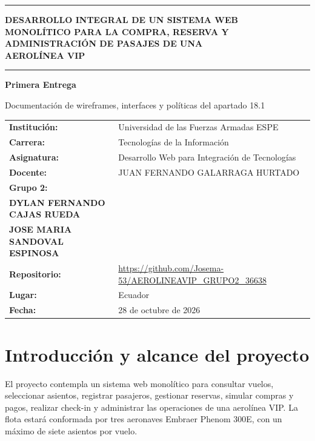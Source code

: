 \documentclass[11pt,a4paper]{article}
\newcommand{\Institucion}{Universidad de las Fuerzas Armadas ESPE}
\newcommand{\Carrera}{Tecnologías de la Información}
\newcommand{\Asignatura}{Desarrollo Web para Integración de Tecnologías}
\newcommand{\Docente}{JUAN FERNANDO GALARRAGA HURTADO}
\newcommand{\NumGrupo}{2}
\newcommand{\FechaEntrega}{28 de octubre de 2026}
\newcommand{\Integrantes}{%
DIEGO ALEJANDRO ALCACIEGA TIGSE\\[4pt]
DYLAN FERNANDO CAJAS RUEDA\\[4pt]
JOSE MARIA SANDOVAL ESPINOSA}
\newcommand{\Repositorio}{\url{https://github.com/Josema-53/AEROLINEAVIP_GRUPO2_36638}}
\begin{document}
\begin{titlepage}
\centering
\vspace*{0.9cm}
{\color{doradovip}\rule{.95\textwidth}{1.4pt}\par}
\vspace{.65cm}
{\Large\bfseries\color{azulvip}
DESARROLLO INTEGRAL DE UN SISTEMA WEB\\[6pt]
MONOLÍTICO PARA LA COMPRA, RESERVA Y\\[6pt]
ADMINISTRACIÓN DE PASAJES DE UNA\\[6pt]
AEROLÍNEA VIP\par}
\vspace{.65cm}
{\color{doradovip}\rule{.95\textwidth}{1.4pt}\par}
\vspace{.7cm}
{\LARGE\bfseries\color{azulvip} Primera Entrega\par}
\vspace{.2cm}
{\normalsize Documentación de wireframes, interfaces y políticas del apartado 18.1\par}
\vspace{1.4cm}
\begin{tabularx}{.95\textwidth}{@{}>{\bfseries}p{2.6cm}X@{}}
Institución: & \Institucion\\[9pt]
Carrera: & \Carrera\\[9pt]
Asignatura: & \Asignatura\\[9pt]
Docente: & \Docente\\[9pt]
Grupo \NumGrupo: & \begin{tabular}[t]{@{}l@{}}\Integrantes\end{tabular}\\ \noalign{\vspace{9pt}}
Repositorio: & \Repositorio\\[9pt]
Lugar: & Ecuador\\[9pt]
Fecha: & \FechaEntrega
\end{tabularx}
\vfill
\end{titlepage}
\tableofcontents
\clearpage
{}

\section{Introducción y alcance del proyecto}
El proyecto contempla un sistema web monolítico para consultar vuelos, seleccionar asientos, registrar pasajeros, gestionar reservas, simular compras y pagos, realizar check-in y administrar las operaciones de una aerolínea VIP. La flota estará conformada por tres aeronaves Embraer Phenom 300E, con un máximo de siete asientos por vuelo.
\end{document}
